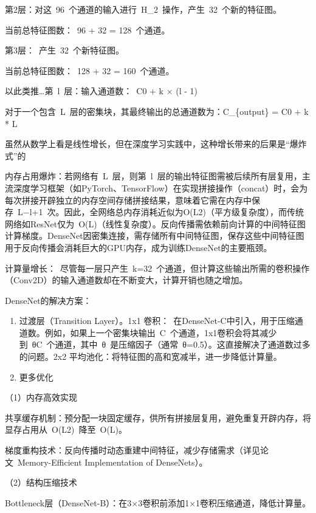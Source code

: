 第2层：对这~96~个通道的输入进行~H\_2~操作，产生~32~个新的特征图。

当前总特征图数：~96 + 32 = 128~个通道。

第3层：~产生~32~个新特征图。

当前总特征图数：~128 + 32 = 160~个通道。

以此类推\ldots 第~l~层：输入通道数：~C0 + k × (l - 1)

对于一个包含~L~层的密集块，其最终输出的总通道数为：C\_\{output\} = C0 + k * L

虽然从数学上看是线性增长，但在深度学习实践中，这种增长带来的后果是``爆炸式''的

内存占用爆炸：若网络有~L~层，则第~l~层的输出特征图需被后续所有层复用，主流深度学习框架（如PyTorch、TensorFlow）在实现拼接操作（concat）时，会为每次拼接开辟独立的内存空间存储拼接结果，意味着它需在内存中保存~L−l+1~次。因此，全网络总内存消耗近似为O(L2)（平方级复杂度），而传统网络如ResNet仅为~O(L)（线性复杂度）。反向传播需依赖前向计算的中间特征图计算梯度。DenseNet因密集连接，需存储所有中间特征图，保存这些中间特征图用于反向传播会消耗巨大的GPU内存，成为训练DenseNet的主要瓶颈。

计算量增长：~尽管每一层只产生~k=32~个通道，但计算这些输出所需的卷积操作（Conv2D）的输入通道数却在不断变大，计算开销也随之增加。

DenseNet的解决方案：

\begin{enumerate}
\def\labelenumi{\arabic{enumi}.}
\item
  过渡层（Transition Layer）。1x1 卷积：~在DenseNet-C中引入，用于压缩通道数。例如，如果上一个密集块输出~C~个通道，1x1卷积会将其减少到~θC~个通道，其中~θ~是压缩因子（通常~θ=0.5）。这直接解决了通道数过多的问题。2x2 平均池化：将特征图的高和宽减半，进一步降低计算量。
\item
  更多优化
\end{enumerate}

（1）内存高效实现\hspace{0pt}

共享缓存机制：预分配一块固定缓存，供所有拼接层复用，避免重复开辟内存，将显存占用从~O(L2)~降至~O(L)。

梯度重构技术：反向传播时动态重建中间特征，减少存储需求（详见论文~Memory-Efficient Implementation of DenseNets）。

（2）结构压缩技术\hspace{0pt}

Bottleneck层（DenseNet-B）：在3×3卷积前添加1×1卷积压缩通道，降低计算量。

